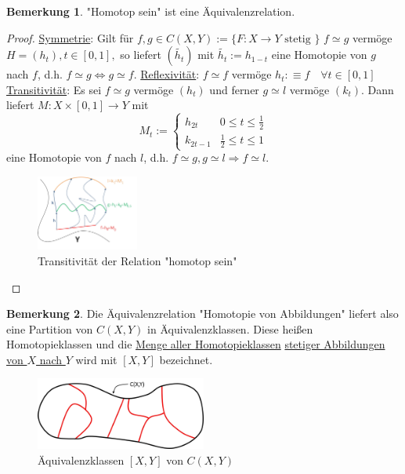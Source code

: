\documentclass[a4paper,11pt,notitlepage]{report}
\theoremstyle{definition}
\newtheorem{remark}{Bemerkung}[chapter]
\begin{document}
\begin{remark}
"Homotop sein" ist eine Äquivalenzrelation.
\end{remark}

\begin{proof}
	\underline{Symmetrie}:
	Gilt für $f,g \in C(X,Y) := \{F \colon X \rightarrow Y \text{ stetig } \}$ $f \simeq g$ vermöge $H=(h_t), t \in [0,1],$ so liefert $(\tilde{h_t})$ mit $\tilde{h_t}:=h_{1-t}$ eine Homotopie von $g$ nach $f$, d.h. $f \simeq g \Leftrightarrow g \simeq f$.
	\newline
	\underline{Reflexivität}:
	$f \simeq f$ vermöge $h_t : \equiv f \quad \forall t \in [0,1]$
	\newline
	\underline{Transitivität}:
	Es sei $f \simeq g$ vermöge $(h_t)$ und ferner $g \simeq l$ vermöge $(k_t)$.
	Dann liefert $M \colon X \times [0,1] \rightarrow Y$ mit
	$$M_t := \begin{cases} h_{2t} & 0 \leq t \leq \frac{1}{2} \\
	k_{2t-1} & \frac{1}{2} \leq t \leq 1
	\end{cases}$$
	eine Homotopie von $f$ nach $l$, d.h. $f \simeq g, g \simeq l \Rightarrow f \simeq l$.
	\begin{figure}[!h]
\centering
\includegraphics[width=0.3\textwidth]{images/Homotopie_Transitivitaet.png}
\caption{Transitivität der Relation "homotop sein"}
\end{figure}
\end{proof}

\begin{remark}
Die Äquivalenzrelation "Homotopie von Abbildungen" liefert also eine Partition von $C(X,Y)$ in Äquivalenzklassen. Diese heißen Homotopieklassen und die \underline{Menge aller Homotopieklassen} \underline{stetiger Abbildungen} \underline{von $X$ nach $Y$} wird mit $[X,Y]$ bezeichnet.
\begin{figure}[h]
\centering
\includegraphics[width=0.5\textwidth]{images/Aequivalenzklassen.png}
\caption{Äquivalenzklassen $[X,Y]$ von $C(X,Y)$}
\end{figure}
\end{remark}
\end{document}
